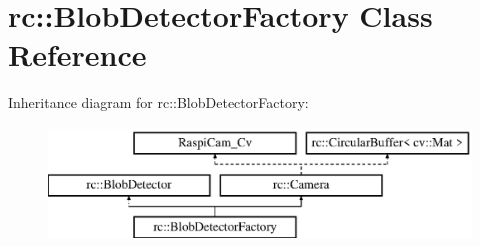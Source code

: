 \hypertarget{classrc_1_1BlobDetectorFactory}{\section{rc\+:\+:Blob\+Detector\+Factory Class Reference}
\label{classrc_1_1BlobDetectorFactory}
}
Inheritance diagram for rc\+:\+:Blob\+Detector\+Factory\+:\begin{figure}[H]
\begin{center}
\leavevmode
\includegraphics[height=3.000000cm]{classrc_1_1BlobDetectorFactory}
\end{center}
\end{figure}
